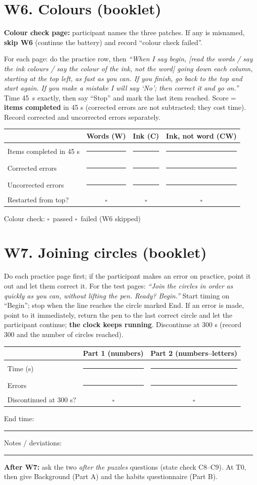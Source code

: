 \documentclass[10pt,a4paper]{article}
\newcommand{\blank}[1][1.2cm]{\rule{#1}{0.4pt}}
\newcommand{\bx}{$\square$}
\begin{document}
\section*{W6. Colours (booklet)}
\textbf{Colour check page:} participant names the three patches. If any is misnamed, \textbf{skip W6} (continue the battery) and record ``colour check failed''.

For each page: do the practice row, then \textit{``When I say begin, [read the words / say the ink colours / say the colour of the ink, not the word] going down each column, starting at the top left, as fast as you can. If you finish, go back to the top and start again. If you make a mistake I will say `No'; then correct it and go on.''} Time 45~s exactly, then say ``Stop'' and mark the last item reached.
Score = \textbf{items completed} in 45 s (corrected errors are not subtracted; they cost time). Record corrected and uncorrected errors separately.

\begin{tabular}{@{}lccc@{}}\toprule & Words (W) & Ink (C) & Ink, not word (CW)\\ \midrule
Items completed in 45 s & \blank & \blank & \blank\\ Corrected errors & \blank & \blank & \blank\\ Uncorrected errors & \blank & \blank & \blank\\ Restarted from top? & \bx & \bx & \bx\\ \bottomrule\end{tabular}

Colour check: \bx\ passed \quad \bx\ failed (W6 skipped)
\section*{W7. Joining circles (booklet)}
Do each practice page first; if the participant makes an error on practice, point it out and let them correct it. For the test pages: \textit{``Join the circles in order as quickly as you can, without lifting the pen. Ready? Begin.''} Start timing on ``Begin''; stop when the line reaches the circle marked End. If an error is made, point to it immediately, return the pen to the last correct circle and let the participant continue; \textbf{the clock keeps running}. Discontinue at 300 s (record 300 and the number of circles reached).

\begin{tabular}{@{}lcc@{}}\toprule & Part 1 (numbers) & Part 2 (numbers--letters)\\ \midrule
Time (s) & \blank & \blank\\ Errors & \blank & \blank\\ Discontinued at 300 s? & \bx & \bx\\ \bottomrule\end{tabular}

\vspace{6pt}End time: \blank[2cm] \qquad Notes / deviations: \blank[9cm]

\textbf{After W7:} ask the two \emph{after the puzzles} questions (state check C8--C9). At T0, then give Background (Part A) and the habits questionnaire (Part B).
\end{document}
